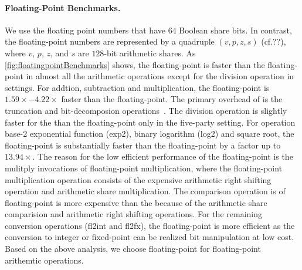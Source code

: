 \paragraph{Floating-Point Benchmarks.}
\label{para:Floating-PointBenchmarking}
We use the \booleanGMW floating point numbers that have $64$ Boolean share bits. In contrast, the \arithmeticGMW floating-point numbers are represented by a quadruple $\left(v, p, z, s\right) $ (cf.??), where $v$, $p$, $z$, and $s$ are $128$-bit arithmetic shares. As \autoref{fig:floatingpointBenchmarks} shows, the \booleanGMW floating-point is faster than the \arithmeticGMW floating-point in almost all the arithmetic operations except for the division operation in \twopc settings. For addtion, subtraction and multiplication, the \booleanGMW floating-point is $1.59\times-4.22\times$ faster than the \arithmeticGMW floating-point. The primary overhead of \arithmeticGMW is the truncation and bit-decomposion operations~\cite{aliasgari2012secure}. The division operation is slightly faster for the \booleanGMW than the \arithmeticGMW floating-point only in the five-party setting. For operation base-2 exponential function (exp2), binary logarithm (log2) and square root, the \booleanGMW floating-point is substantially faster than the \arithmeticGMW floating-point by a factor up to $13.94\times$. The reason for the low efficient performance of the \arithmeticGMW floating-point is the mulitply invocations of floating-point multiplication, where the floating-point multiplication operation consists of the expensive arithmetic right shifting operation and arithmetic share multiplication. The comparison operation is of \arithmeticGMW floating-point is more expensive than the \booleanGMW because of the arithmetic share comparision and arithmetic right shifting operations. For the remaining conversion operations (fl2int and fl2fx), the \booleanGMW floating-point is more efficient as the conversion to integer or fixed-point can be realized bit manipulation at low cost. Based on the above analysis, we choose \booleanGMW floating-point for floating-point arithemtic operations.



